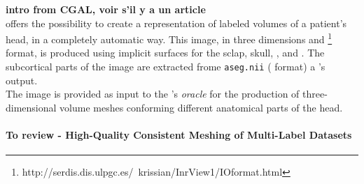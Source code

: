 {\bf intro from CGAL, voir s'il y a un article}\\
\FIJEE{} offers the possibility to create a representation of labeled volumes of a patient's head, in a completely automatic way. This image, in three dimensions and \INRIMAGE{}\footnote{http://serdis.dis.ulpgc.es/~krissian/InrView1/IOformat.html} format, is produced using implicit surfaces for the sclap, skull, \CSF{}, \GM{} and \WM{}. The subcortical parts of the image are extracted frome \texttt{aseg.nii} (\NIFTI{} format) a \FREESURFER{}'s output. \\
The image \INRIMAGE{} is provided as input to the \CGAL{}'s {\it oracle} for the production of three-dimensional volume meshes conforming different anatomical parts of the head.

\paragraph{To review - High-Quality Consistent Meshing of Multi-Label Datasets}
